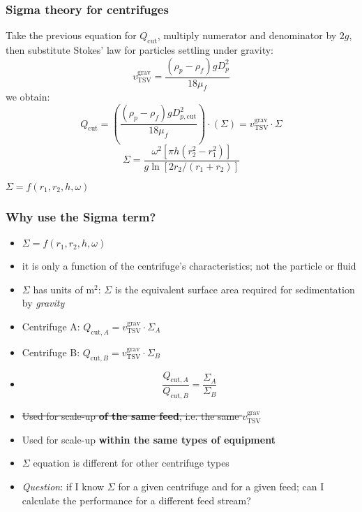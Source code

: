 \begin{frame}\frametitle{Sigma theory for centrifuges}
	Take the previous equation for $Q_\text{cut}$, multiply numerator and denominator by $2g$, then substitute Stokes' law for particles settling under gravity:
	\[
		v_\text{TSV}^\text{grav} = \frac{\left( \rho_p - \rho_f \right) g D_p^2}{18 \mu_f}
	\]
	we obtain:
	\[
		Q_\text{cut} =  \left( \frac{\left( \rho_p - \rho_f \right) g D_{p,\text{cut}}^2}{18 \mu_f}  \right) \cdot ( \Sigma ) =  v_\text{TSV}^\text{grav} \cdot \Sigma
	\]
	\[
		\Sigma = \frac{\omega^2 \left[\pi h \left(r_2^2 - r_1^2\right)\right]}{g \ln \left[2r_2/(r_1+r_2) \right]}
	\]

	\vspace{12pt}
	$\Sigma = f(r_1, r_2, h, \omega)$
\end{frame}

\begin{frame}\frametitle{Why use the Sigma term?}
	\begin{itemize}
		\item	$\Sigma = f(r_1, r_2, h, \omega)$
		\item	it is only a function of the centrifuge's characteristics; not the particle or fluid
		\item	$\Sigma$ has units of $\text{m}^2$: {\color{purple}$\Sigma$ is the equivalent surface area} required for sedimentation by \emph{gravity}
		\item	Centrifuge A: $Q_{\text{cut},A} = v_\text{TSV}^\text{grav} \cdot \Sigma_A$
		\item	Centrifuge B: $Q_{\text{cut},B} = v_\text{TSV}^\text{grav} \cdot \Sigma_B$
		\item	\[
					\frac{Q_{\text{cut},A}}{Q_{\text{cut},B}}  = \frac{\Sigma_A}{\Sigma_B}
				\]
		\item	{\color{red}\sout{Used for scale-up \textbf{of the same feed}, i.e. the same $v_\text{TSV}^\text{grav}$}}
		\item	Used for scale-up \textbf{within the same types of equipment}
		\item	$\Sigma$ equation is different for other centrifuge types
		\item	\emph{Question}: if I know $\Sigma$ for a given centrifuge and for a given feed; can I calculate the performance for a different feed stream?
	\end{itemize}
\end{frame}

